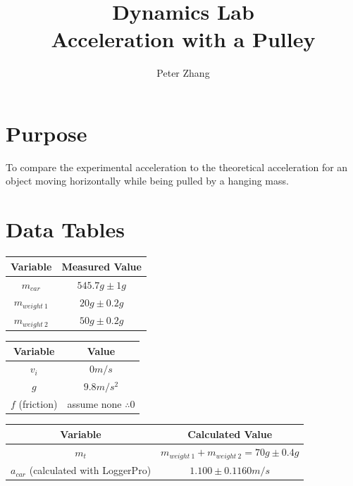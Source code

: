 \documentclass{article}
\title{Dynamics Lab\\Acceleration with a Pulley}
\author{Peter Zhang}
\begin{document}
\maketitle
\newpage
\tableofcontents
\newpage


\section{Purpose}
To compare the experimental acceleration to the theoretical acceleration for an object moving horizontally while being pulled by a hanging mass.

\section{Data Tables}

\begin{center}
	\begin{tabular}{|c|c|}
		\hline
		Variable & Measured Value\\
		\hline \hline
		$m_{car}$ & $545.7g\pm1g$\\
		\hline
		$m_{weight\ 1}$ & $20g\pm0.2g$\\
		\hline
		$m_{weight\ 2}$ & $50g\pm0.2g$\\
		\hline
	\end{tabular}
\end{center}

\begin{center}
	\begin{tabular}{|c|c|}
		\hline
		Variable & Value\\
		\hline \hline
		$v_{i}$ & $0m/s$\\
		\hline
		$g$ & $9.8m/s^2$\\
		\hline
		$f$ (friction) & assume none $\therefore{0}$\\
		\hline
	\end{tabular}
\end{center}

\begin{center}
	\begin{tabular}{|c|c|}
		\hline
		Variable & Calculated Value\\
		\hline \hline
		$m_{t}$ & $m_{weight\ 1} + m_{weight\ 2} = 70g\pm0.4g$\\
		\hline
		$a_{car}$ (calculated with LoggerPro) & $1.100\pm0.1160m/s$\\
		\hline
	\end{tabular}
\end{center}
\end{document}
